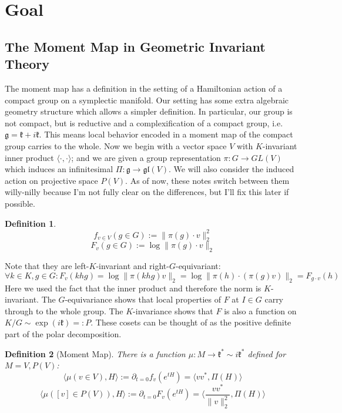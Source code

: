 \documentclass{article}
\newtheorem{definition}{Definition}
\begin{document}
\section{Goal}

\subsection{The Moment Map in Geometric Invariant Theory}

The moment map has a definition in the setting of a Hamiltonian action of a compact group on a symplectic manifold. Our setting has some extra algebraic geometry structure which allows a simpler definition. In particular, our group is not compact, but is reductive and a complexification of a compact group, i.e. $\mathfrak{g} = \mathfrak{k} + i \mathfrak{k}$. This means local behavior encoded in a moment map of the compact group carries to the whole. Now we begin with a vector space $V$ with $K$-invariant inner product $\langle \cdot, \cdot \rangle$; and we are given a group representation $\pi : G \to GL(V)$ which induces an infinitesimal $\Pi : \mathfrak{g} \to \mathfrak{gl}(V)$. We will also consider the induced action on projective space $P(V)$. As of now, these notes switch between them willy-nilly because I'm not fully clear on the differences, but I'll fix this later if possible. 

\begin{definition} 
\[ f_{v \in V}(g \in G) := \|\pi(g) \cdot v\|_{2}^{2} \]
\[ F_{v}(g \in G) := \log \|\pi(g) \cdot v\|_{2}  \]
\end{definition}
Note that they are left-$K$-invariant and right-$G$-equivariant:
\[ \forall k \in K, g \in G: F_{v}(khg) = \log \|\pi(khg) v\|_{2} = \log \|\pi(h) \cdot (\pi(g) v)\|_{2} = F_{g \cdot v}(h)   \]
Here we used the fact that the inner product and therefore the norm is $K$-invariant. The $G$-equivariance shows that local properties of $F$ at $I \in G$ carry through to the whole group. The $K$-invariance shows that $F$ is also a function on $K/G \sim \exp(i \mathfrak{k}) =: P$. These cosets can be thought of as the positive definite part of the polar decomposition. 

\begin{definition} [Moment Map]
There is a function $\mu : M \to \mathfrak{k}^{*} \sim i \mathfrak{k}^{*}$ defined for $M = V,P(V)$:
\[ \langle \mu(v \in V), H \rangle := \partial_{t=0} f_{v}(e^{tH}) = \langle v v^{*}, \Pi(H) \rangle   \]
\[ \langle \mu([v] \in P(V)), H \rangle := \partial_{t=0} F_{v}(e^{tH}) = \langle \frac{v v^{*}}{\|v\|_{2}^{2}}, \Pi(H) \rangle  \]
\end{definition}
\end{document}
